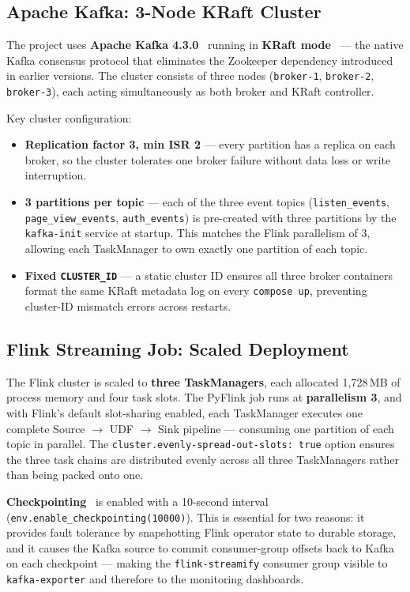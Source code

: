 \subsection{Apache Kafka: 3-Node KRaft Cluster}

The project uses \textbf{Apache Kafka 4.3.0}~\cite{kafka} running in \textbf{KRaft mode}~\cite{kafka_kraft} — the native Kafka
consensus protocol that eliminates the Zookeeper dependency introduced in earlier versions.
The cluster consists of three nodes (\texttt{broker-1}, \texttt{broker-2}, \texttt{broker-3}),
each acting simultaneously as both broker and KRaft controller.

Key cluster configuration:
\begin{itemize}
  \item \textbf{Replication factor 3, min ISR 2} — every partition has a replica on each broker,
        so the cluster tolerates one broker failure without data loss or write interruption.
  \item \textbf{3 partitions per topic} — each of the three event topics
        (\texttt{listen\_events}, \texttt{page\_view\_events}, \texttt{auth\_events}) is
        pre-created with three partitions by the \texttt{kafka-init} service at startup.
        This matches the Flink parallelism of 3, allowing each TaskManager to own exactly one
        partition of each topic.
  \item \textbf{Fixed \texttt{CLUSTER\_ID}} — a static cluster ID ensures all three broker
        containers format the same KRaft metadata log on every \texttt{compose up}, preventing
        cluster-ID mismatch errors across restarts.
\end{itemize}

\subsection{Flink Streaming Job: Scaled Deployment}

The Flink cluster is scaled to \textbf{three TaskManagers}, each allocated 1,728\,MB of process
memory and four task slots.
The PyFlink job runs at \textbf{parallelism 3}, and with Flink's default slot-sharing enabled,
each TaskManager executes one complete Source $\to$ UDF $\to$ Sink pipeline — consuming one
partition of each topic in parallel.
The \texttt{cluster.evenly-spread-out-slots: true} option ensures the three task chains are
distributed evenly across all three TaskManagers rather than being packed onto one.

\textbf{Checkpointing}~\cite{flink_checkpointing} is enabled with a 10-second interval
(\texttt{env.enable\_checkpointing(10000)}).
This is essential for two reasons: it provides fault tolerance by snapshotting Flink operator
state to durable storage, and it causes the Kafka source to commit consumer-group offsets back
to Kafka on each checkpoint — making the \texttt{flink-streamify} consumer group visible to
\texttt{kafka-exporter} and therefore to the monitoring dashboards.

